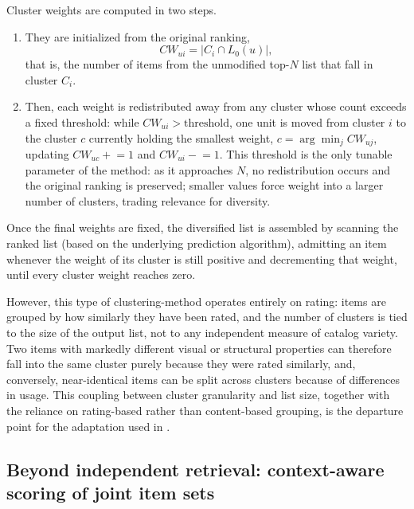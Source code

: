 Cluster weights are computed in two steps. 

\begin{enumerate}
    \item They are initialized from the original ranking,
        \[
        CW_{ui} = |C_i \cap L_0(u)|,
        \]
        that is, the number of items from the unmodified top-$N$ list that fall in cluster $C_i$. 

    \item Then, each weight is redistributed away from any cluster whose count exceeds a fixed threshold: while $CW_{ui} > \text{threshold}$, one unit is moved from cluster $i$ to the cluster $c$ currently holding the smallest weight, $c = \arg\min_j CW_{uj}$, updating $CW_{uc} \mathrel{+}= 1$ and $CW_{ui} \mathrel{-}= 1$.  This threshold is the only tunable parameter of the method: as it approaches $N$, no redistribution occurs and the original ranking is preserved; smaller values force weight into a larger number of clusters, trading relevance for diversity.
\end{enumerate}


Once the final weights are fixed, the diversified list is assembled by scanning the ranked list (based on the underlying prediction algorithm), admitting an item whenever the weight of its cluster is still positive and decrementing that weight, until every cluster weight reaches zero.

However, this type of clustering-method operates entirely on rating: items are grouped by how similarly they have been rated, and the number of clusters is tied to the size of the output list, not to any independent measure of catalog variety. Two items with markedly different visual or structural properties can therefore fall into the same cluster purely because they were rated similarly, and, conversely, near-identical items can be split across clusters because of differences in usage. This coupling between cluster granularity and list size, together with the reliance on rating-based rather than content-based grouping, is the departure point for the adaptation used in .


\subsection{Beyond independent retrieval: context-aware scoring of joint item sets}
\label{sec:sota-page-aware-scoring}

